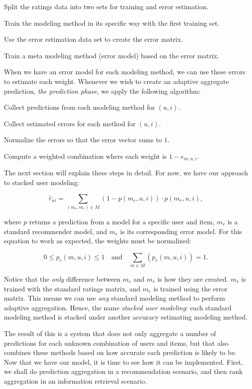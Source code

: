 \begin{enumerate*}
  \item Split the ratings data into two sets for training and error estimation.
  \item Train the modeling method in its specific way with the first training set.
  \item Use the error estimation data set to create the error matrix.
  \item Train a meta modeling method (error model) based on the error matrix.
\end{enumerate*}

When we have an error model for each modeling method, 
we can use these errors to estimate each weight.
Whenever we wish to create an adaptive aggregate prediction,
\emph{the prediction phase},
we apply the following algorithm:

\begin{enumerate*}
  \item Collect predictions from each modeling method for $(u,i)$.
  \item Collect estimated errors for each method for $(u,i)$.
  \item Normalize the errors so that the error vector sums to $1$.
  \item Compute a weighted combination where each weight is $1 - e_{m,u,i}$.
\end{enumerate*}

The next section will explain these steps in detail.
For now, we have our approach to stacked user modeling:

\begin{equation*}
  \hat{r}_{ui} = \sum_{(m_{e}, m_{r}) \in M} (1 - p(m_{e},u,i)) \cdot p(m_{r},u,i),
\end{equation*}

where $p$ returns a prediction from a model for a specific user and item,
$m_{r}$ is a standard recommender model, 
and $m_{e}$ is its corresponding error model.
For this equation to work as expected, the weights must be normalized:

\begin{equation*}
  0 \leq p_{e}(m,u,i) \leq 1 \quad \text{and} \quad \sum_{m \in M} (p_{e}(m,u,i)) = 1.
\end{equation*}

Notice that the \emph{only} difference between $m_e$ and $m_r$ is how they are created.
$m_r$ is trained with the standard ratings matrix, and $m_e$ is trained using the error matrix.
This means we can use \emph{any} standard modeling method to perform adaptive aggregation.
Hence, the name \emph{stacked user modeling}: 
each standard modeling method is stacked under another accuracy estimating modeling method.

The result of this is a system that does not only aggregate a number of predictions for each unknown
combination of users and items,
but that also combines these methods based on how accurate each prediction is likely to be.
Now that we have our model, it is time to see how it can be implemented.
First, we shall do prediction aggregation in a recommendation scenario,
and then rank aggregation in an information retrieval scenario.

\clearpage
